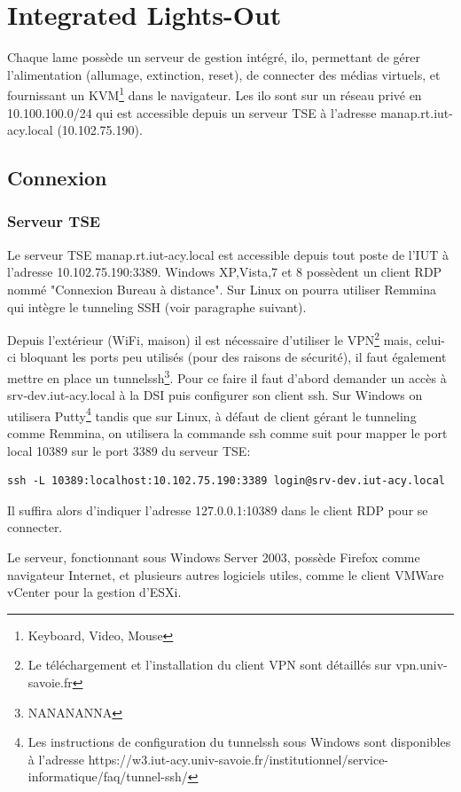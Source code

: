\documentclass[a4paper,oneside]{report}
\begin{document}
\section{Integrated Lights-Out}
Chaque lame possède un serveur de gestion intégré, \gls{ilo}, permettant de gérer l'alimentation (allumage, extinction, reset), de connecter des médias virtuels, et fournissant un KVM\footnote{Keyboard, Video, Mouse} dans le navigateur.
Les \gls{ilo} sont sur un réseau privé en 10.100.100.0/24 qui est accessible depuis un serveur TSE à l'adresse manap.rt.iut-acy.local (10.102.75.190).

\subsection{Connexion}
\subsubsection{Serveur TSE}
Le serveur TSE manap.rt.iut-acy.local est accessible depuis tout poste de l'IUT à l'adresse 10.102.75.190:3389. Windows XP,Vista,7 et 8 possèdent un client RDP nommé "Connexion Bureau à distance". Sur Linux on pourra utiliser Remmina qui intègre le tunneling SSH (voir paragraphe suivant).


Depuis l'extérieur (WiFi, maison) il est nécessaire d'utiliser le VPN\footnote{Le téléchargement et l'installation du client VPN sont détaillés sur vpn.univ-savoie.fr} mais, celui-ci bloquant les ports peu utilisés (pour des raisons de sécurité), il faut également mettre en place un \gls{tunnelssh}\footnote{NANANANNA}.
Pour ce faire il faut d'abord demander un accès à srv-dev.iut-acy.local à la DSI puis configurer son client \gls{ssh}.\newline
Sur Windows on utilisera Putty\footnote{Les instructions de configuration du \gls{tunnelssh} sous Windows sont disponibles à l'adresse https://w3.iut-acy.univ-savoie.fr/institutionnel/service-informatique/faq/tunnel-ssh/} tandis que sur Linux, à défaut de client gérant le tunneling comme Remmina, on utilisera la commande ssh comme suit pour mapper le port local 10389 sur le port 3389 du serveur TSE:
\label{tunnelingSsh}
\begin{verbatim}
ssh -L 10389:localhost:10.102.75.190:3389 login@srv-dev.iut-acy.local
\end{verbatim}
Il suffira alors d'indiquer l'adresse 127.0.0.1:10389 dans le client RDP pour se connecter.

Le serveur, fonctionnant sous Windows Server 2003, possède Firefox comme navigateur Internet, et plusieurs autres logiciels utiles, comme le client VMWare vCenter pour la gestion d'ESXi.
\end{document}

